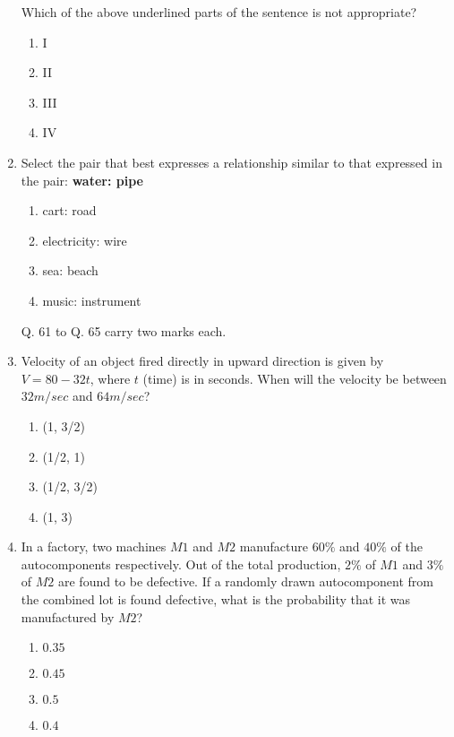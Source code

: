 \documentclass[journal]{IEEEtran}
\begin{document}
\begin{enumerate}
Which of the above underlined parts of the sentence is not appropriate?

\begin{enumerate}
    \item I
    \item II
    \item III
    \item IV\\
\end{enumerate}

\item Select the pair that best expresses a relationship similar to that expressed in the pair: \textbf{water: pipe}

\begin{enumerate}
    \item cart: road
    \item electricity: wire
    \item sea: beach
    \item music: instrument\\
\end{enumerate}

Q. 61 to Q. 65 carry two marks each.\\

\item Velocity of an object fired directly in upward direction is given by $V = 80 - 32t$, where $t$ (time) is in seconds. When will the velocity be between $32 m/sec$ and $64 m/sec$?

\begin{enumerate}
    \item (1, 3/2)
    \item (1/2, 1)
    \item (1/2, 3/2)
    \item (1, 3)\\
\end{enumerate}

\item In a factory, two machines $M1$ and $M2$ manufacture $60\%$ and $40\%$ of the autocomponents respectively. Out of the total production, $2\%$ of $M1$ and $3\%$ of $M2$ are found to be defective. If a randomly drawn autocomponent from the combined lot is found defective, what is the probability that it was manufactured by $M2$?

\begin{enumerate}
    \item $0.35$
    \item $0.45$
    \item $0.5$
    \item $0.4$\\
\end{enumerate}


\end{enumerate}
\end{document}
